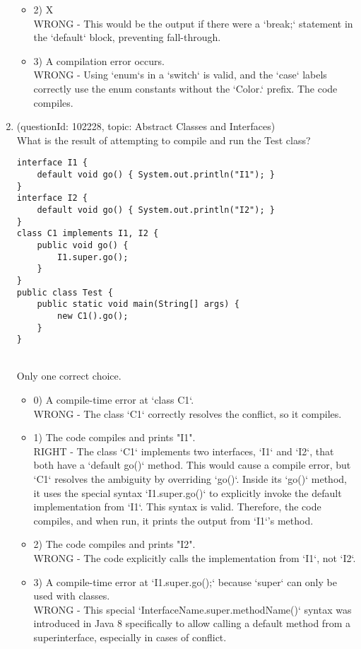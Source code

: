 \documentclass[12pt]{article}
\begin{document}
\begin{enumerate}[label=(\arabic*)]
\begin{itemize}
\item 2) X
 \\ 
WRONG - This would be the output if there were a `break;` statement in the `default` block, preventing fall-through.

\item 3) A compilation error occurs.
 \\ 
WRONG - Using `enum`s in a `switch` is valid, and the `case` labels correctly use the enum constants without the `Color.` prefix. The code compiles.

\end{itemize}
\item (questionId: 102228, topic: Abstract Classes and Interfaces) \\ 
What is the result of attempting to compile and run the Test class?\n\begin{verbatim}
interface I1 {
    default void go() { System.out.println("I1"); }
}
interface I2 {
    default void go() { System.out.println("I2"); }
}
class C1 implements I1, I2 {
    public void go() {
        I1.super.go();
    }
}
public class Test {
    public static void main(String[] args) {
        new C1().go();
    }
}
\end{verbatim}
\\ \noindent Only one correct choice. 
\begin{itemize}
\item 0) A compile-time error at `class C1`.
 \\ 
WRONG - The class `C1` correctly resolves the conflict, so it compiles.

\item 1) The code compiles and prints "I1".
 \\ 
RIGHT - The class `C1` implements two interfaces, `I1` and `I2`, that both have a `default go()` method. This would cause a compile error, but `C1` resolves the ambiguity by overriding `go()`. Inside its `go()` method, it uses the special syntax `I1.super.go()` to explicitly invoke the default implementation from `I1`. This syntax is valid. Therefore, the code compiles, and when run, it prints the output from `I1`'s method.

\item 2) The code compiles and prints "I2".
 \\ 
WRONG - The code explicitly calls the implementation from `I1`, not `I2`.

\item 3) A compile-time error at `I1.super.go();` because `super` can only be used with classes.
 \\ 
WRONG - This special `InterfaceName.super.methodName()` syntax was introduced in Java 8 specifically to allow calling a default method from a superinterface, especially in cases of conflict.


\end{itemize}
\end{enumerate}
\end{document}
